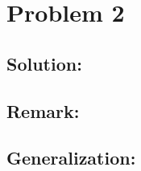 \section*{Problem 2}

\vspace{4mm}

\subsection*{Solution:}


\subsection*{Remark:}


\subsection*{Generalization:}




